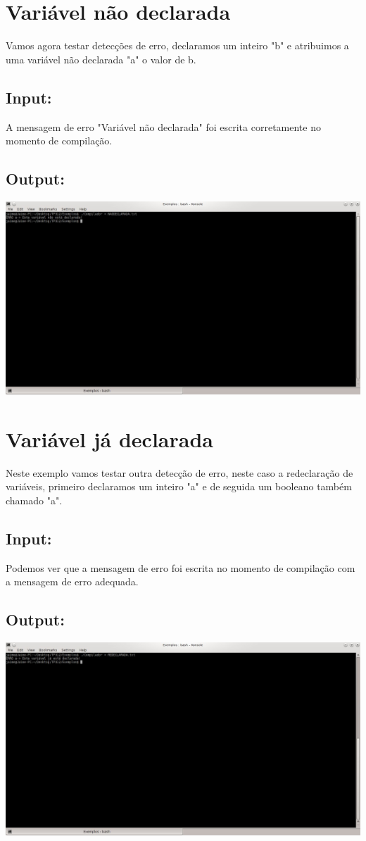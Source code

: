 \documentclass{report}
\begin{document}
\section{Variável não declarada}
Vamos agora testar detecções de erro, declaramos um inteiro "b" e atribuimos a uma variável não declarada "a" o valor de b.
\subsection{Input:}
A mensagem de erro "Variável não declarada" foi escrita corretamente no momento de compilação.
\subsection{Output:}

\includegraphics[width=\linewidth]{NaoDeclarada.jpg}

\section{Variável já declarada}
Neste exemplo vamos testar outra detecção de erro, neste caso a redeclaração de variáveis, primeiro declaramos um inteiro "a" e de seguida um booleano também chamado "a".
\subsection{Input:}
Podemos ver que a mensagem de erro foi escrita no momento de compilação com a mensagem de erro adequada.
\subsection{Output:}

\includegraphics[width=\linewidth]{Redeclarada.jpg}
\end{document}
